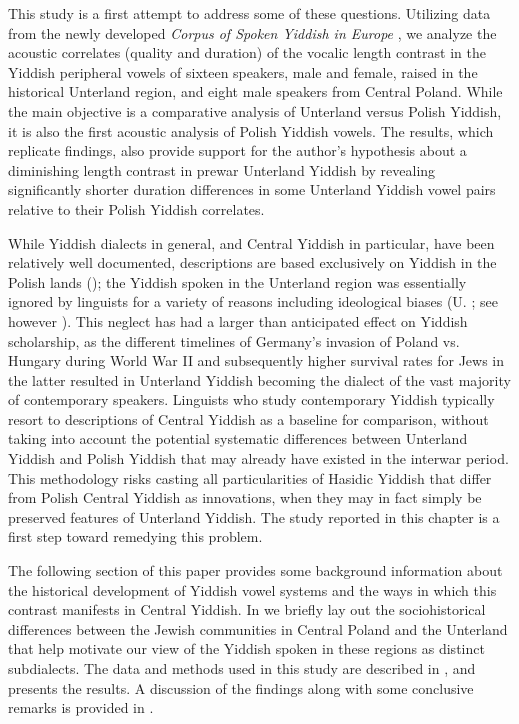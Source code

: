 \documentclass[output=paper,colorlinks,citecolor=brown]{langscibook}
\begin{document}
This study is a first attempt to address some of these questions. Utilizing data from the newly developed \textit{Corpus of Spoken Yiddish in Europe} \citep{BleamanNovePress}, we analyze the acoustic correlates (quality and duration) of the vocalic length contrast in the Yiddish peripheral vowels of sixteen speakers, male and female, raised in the historical Unterland region, and eight male speakers from Central Poland. While the main objective is a comparative analysis of Unterland versus Polish Yiddish, it is also the first acoustic analysis of Polish Yiddish vowels. The results, which replicate  findings, also provide support for the author's hypothesis about a diminishing length contrast in prewar Unterland Yiddish by revealing significantly shorter duration differences in some Unterland Yiddish vowel pairs relative to their Polish Yiddish correlates.

\newpage

While Yiddish dialects in general, and Central Yiddish in particular, have been relatively well documented, descriptions are based exclusively on Yiddish in the Polish lands (\citealt{Herzog1965, Jacobs1993, Jacobs2005}); the Yiddish spoken in the Unterland region was essentially ignored by linguists for a variety of reasons including ideological biases (U. \citealt{Weinreich1964}; see however \citealt{SadockMasor2018}). This neglect has had a larger than anticipated effect on Yiddish scholarship, as the different timelines of Germany's invasion of Poland vs. Hungary during World War II and subsequently higher survival rates for Jews in the latter resulted in Unterland Yiddish becoming the dialect of the vast majority of contemporary speakers. Linguists who study contemporary Yiddish typically resort to descriptions of Central Yiddish as a baseline for comparison, without taking into account the potential systematic differences between Unterland Yiddish and Polish Yiddish that may already have existed in the interwar period. This methodology risks casting all particularities of Hasidic Yiddish that differ from Polish Central Yiddish as innovations, when they may in fact simply be preserved features of Unterland Yiddish. The study reported in this chapter is a first step toward remedying this problem.


{{The following section of this paper provides some background information about the historical development of Yiddish vowel systems and the ways in which this contrast manifests in Central Yiddish. In  we briefly lay out the sociohistorical differences between the Jewish communities in Central Poland and the Unterland that help motivate our view of the Yiddish spoken in these regions as distinct subdialects. The data and methods used in this study are described in , and  presents the results. A discussion of the findings along with some conclusive remarks is provided in .}}
\end{document}
